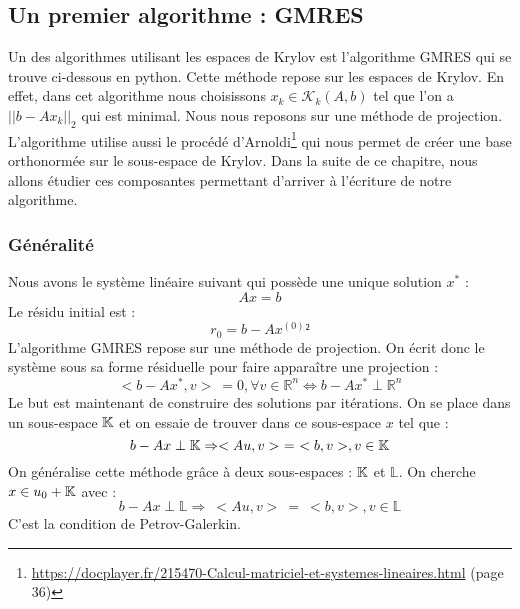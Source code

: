 \subsection{Un premier algorithme : GMRES}
Un des algorithmes utilisant les espaces de Krylov est l'algorithme GMRES qui se trouve ci-dessous en python. Cette méthode repose sur les espaces de Krylov. En effet, dans cet algorithme nous choisissons $x_k \in \mathcal{K}_k(A, b)$ tel que l'on a $||b - Ax_k||_2$ qui est minimal. Nous nous reposons sur une méthode de projection. L'algorithme utilise aussi le procédé d'Arnoldi\footnote{\url{https://docplayer.fr/215470-Calcul-matriciel-et-systemes-lineaires.html} (page 36)} qui nous permet de créer une base orthonormée sur le sous-espace de Krylov. Dans la suite de ce chapitre, nous allons étudier ces composantes permettant d'arriver à l'écriture de notre algorithme.

\subsubsection{Généralité}
Nous avons le système linéaire suivant qui possède une unique solution $x^*$ : 
\begin{equation}
Ax = b
\end{equation}
Le résidu initial est  : 
\begin{equation}
r_0 = b - A x^{(0)}²
\end{equation}
L'algorithme GMRES repose sur une méthode de projection. On écrit donc le système sous sa forme résiduelle pour faire apparaître une projection : 
\begin{equation}
<b - Ax^*, v>\ = 0, \forall v \in \mathbb{R}^n \Leftrightarrow b - Ax^* \perp \mathbb{R}^n
\label{pb_res}
\end{equation}
Le but est maintenant de construire des solutions par itérations. On se place dans un sous-espace $\mathbb{K}$ et on essaie de trouver dans ce sous-espace $x$ tel que : 
\begin{equation}
b - Ax \perp \mathbb{K} \Rightarrow <Au, v>\ =\ <b, v>, v \in \mathbb{K}
\end{equation}
On généralise cette méthode grâce à deux sous-espaces : $\mathbb{K}$ et  $\mathbb{L}$. On cherche $x \in u_0 + \mathbb{K}$ avec :
\begin{equation}
b - Ax \perp \mathbb{L} \Rightarrow \ <Au, v>\ =\ <b, v>, v \in \mathbb{L}
\label{Petrov-Galerkin}
\end{equation}
C'est la condition de Petrov-Galerkin.

